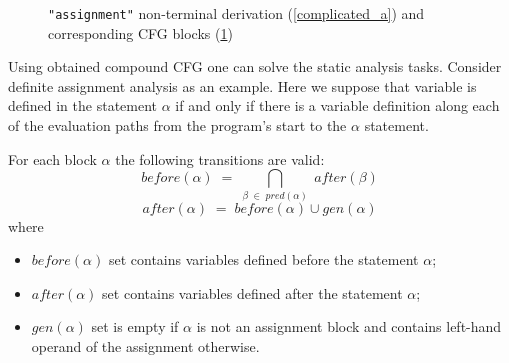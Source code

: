 \documentclass{sig-alternate-05-2015}
\begin{document}
\begin{figure}[h!]
\begin{center}
\begin{subfigure}{0.1\textwidth}
        \caption{}
        \label{complicated_b}
    \end{subfigure}
    \caption{\texttt{"assignment"} non-terminal derivation (\ref{complicated_a}) and corresponding CFG blocks (\ref{complicated_b})}
    \label{complicated_example_pic}
    \end{center}
\end{figure}
Using obtained compound CFG one can solve the static analysis tasks. Consider definite assignment analysis as an example. Here we suppose that variable is defined in the statement $\alpha$ if and only if there is a variable definition along each of the evaluation paths from the program's start to the $\alpha$ statement. 

For each block $\alpha$ the following transitions are valid:
$$
before (\alpha) \;=\; \bigcap_{\beta \;\in\; pred(\alpha)} \;after(\beta)
$$
$$
after (\alpha) \;=\; before(\alpha) \cup gen(\alpha)
$$
where
\begin{itemize}
\item $before(\alpha)$ set contains variables defined before the statement $\alpha$;
\item $after(\alpha)$ set contains variables defined after the statement $\alpha$;
\item $gen(\alpha)$ set is empty if $\alpha$ is not an assignment block and contains left-hand operand of the assignment otherwise. 
\end{itemize}
\end{document}

